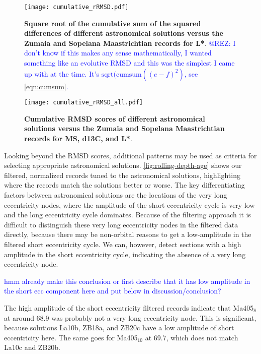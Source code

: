 \documentclass[draft]{agujournal2019}
\newcommand{\ijk}{\textcolor{blue}}
\begin{document}
\setcounter{figure}{3000}
\begin{figure}[htb]
  \centering
  \texttt{[image: cumulative\_rRMSD.pdf]}
  \caption{\label{fig:cum-RMSD}
    \textbf{Square root of the cumulative sum of the squared differences of different astronomical solutions versus the Zumaia and Sopelana Maastrichtian records for \gls{L*}}.
    \ijk{@REZ: I don't know if this makes any sense mathematically, I wanted something like an evolutive RMSD and this was the simplest I came up with at the time.
    It's \(\text{sqrt}(\text{cumsum}((e - f)^2)\), see \cref{eqn:cumsum}.}
}
\end{figure}

\setcounter{figure}{3001}
\begin{figure}[htb]
  \centering
  \texttt{[image: cumulative\_rRMSD\_all.pdf]}
  \caption{\label{fig:cum-RMSD-all}
    \textbf{Cumulative \gls{RMSD} scores of different astronomical solutions versus the Zumaia and Sopelana Maastrichtian records for \gls{MS}, \gls{d13C}, and \gls{L*}}.
}
\end{figure}

Looking beyond the \gls{RMSD} scores, additional patterns may be used as criteria for selecting appropriate astronomical solutions.
\cref{fig:rolling-depth-age} shows our filtered, normalized records tuned to the astronomical solutions, highlighting where the records match the solutions better or worse.
The key differentiating factors between astronomical solutions are the locations of the very long eccentricity nodes, where the amplitude of the short eccentricity cycle is very low and the long eccentricity cycle dominates.
Because of the filtering approach it is difficult to distinguish these very long eccentricity nodes in the filtered data directly, because there may be non-orbital reasons to get a low-amplitude in the filtered short eccentricity cycle.
We can, however, detect sections with a high amplitude in the short eccentricity cycle, indicating the absence of a very long eccentricity node.

\ijk{hmm already make this conclusion or first describe that it has low amplitude in the short ecc component here and put below in discussion/conclusion?}

The high amplitude of the short eccentricity filtered records indicate that Ma405\(_{8}\) at around \qty{68.9}{\millionyearago} was probably not a very long eccentricity node.
This is significant, because solutions La10b, ZB18a, and ZB20c have a low amplitude of short eccentricity here.
The same goes for Ma405\(_{10}\) at \qty{69.7}{\millionyearago}, which does not match La10c and ZB20b.
\end{document}
